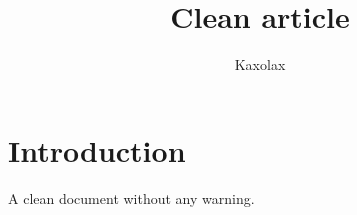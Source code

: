 \documentclass{article}
\title{Clean article}
\author{Kaxolax}
\begin{document}
\maketitle
\section{Introduction}
A clean document without any warning.
\end{document}
